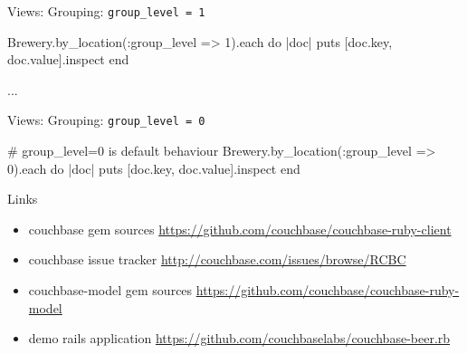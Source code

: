 \documentclass[aspectratio=43]{beamer}
\begin{document}
\begin{frame}[fragile]{Views: Grouping: \texttt{group\_level = 1}}
  \begin{semiverbatim}
  Brewery.by_location(\alert<3>{:group_level => 1}).each do |doc|
    puts [\alert<3>{doc.key}, doc.value].inspect
  end
  \end{semiverbatim}

  \pause

  \begin{semiverbatim}
  [\alert<3>{["Argentina"]}, 2]
  [\alert<3>{["Australia"]}, 13]
  [\alert<3>{["Austria"]}, 10]
  [\alert<3>{["Belgium"]}, 98]
  [\alert<3>{["Belize"]}, 1]
  [\alert<3>{["Brazil"]}, 2]
  [\alert<3>{["Canada"]}, 45]
  [\alert<3>{["China"]}, 2]
  ...
  \end{semiverbatim}
\end{frame}

\begin{frame}[fragile]{Views: Grouping: \texttt{group\_level = 0}}
  \begin{semiverbatim}
  # group_level=0 is default behaviour
  Brewery.by_location(\alert<3>{:group_level => 0}).each do |doc|
    puts [\alert<3>{doc.key}, doc.value].inspect
  end
  \end{semiverbatim}

  \pause

  \begin{semiverbatim}
  \end{semiverbatim}
\end{frame}

\begin{frame}[fragile]{Links}
  \begin{itemize}
    \item couchbase gem sources
      \url{https://github.com/couchbase/couchbase-ruby-client}
    \item couchbase issue tracker
      \url{http://couchbase.com/issues/browse/RCBC}
    \item couchbase-model gem sources
      \url{https://github.com/couchbase/couchbase-ruby-model}
    \item demo rails application
      \url{https://github.com/couchbaselabs/couchbase-beer.rb}
  \end{itemize}
\end{frame}
\end{document}
